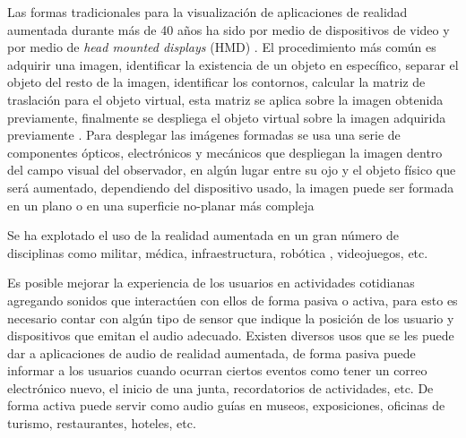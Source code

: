 \documentclass[12pt,a4paper,spanish,openany]{book}
\begin{document}
Las formas tradicionales para la visualización de aplicaciones de realidad
aumentada durante más de 40 años ha sido por medio de dispositivos de video y
por medio de \emph{head mounted displays} \cite{183317} (HMD)
\cite{Bimber:2007:MAA:1281500.1281628}. El
procedimiento más común es adquirir una imagen,
identificar la existencia de un objeto en específico, separar el objeto del
resto de la imagen, identificar los contornos, calcular la matriz de
traslación para el objeto virtual, esta matriz se aplica sobre la imagen
obtenida previamente, finalmente se despliega el objeto virtual sobre la imagen
adquirida previamente \cite{aroasf}. Para desplegar las imágenes formadas se usa
una serie de componentes ópticos, electrónicos y mecánicos que despliegan la
imagen  dentro del campo visual del observador, en algún lugar entre su ojo y
el objeto físico que será aumentado, dependiendo del dispositivo usado, la
imagen puede ser formada en un plano o en una superficie no-planar más compleja
\cite{Bimber:2007:MAA:1281500.1281628}



Se ha explotado el uso de la realidad aumentada en un gran número de
disciplinas como militar, médica\cite{mrigd},
infraestructura\cite{1527367}, robótica\cite{vhli} \cite{rmac}, videojuegos,
etc.

Es posible mejorar la experiencia de los usuarios en actividades cotidianas
agregando sonidos que interactúen con ellos de forma pasiva o activa, para esto
es necesario contar con algún tipo de sensor que indique la posición de los
usuario y dispositivos que emitan el audio adecuado. Existen diversos usos que
se les puede dar a aplicaciones de audio de realidad aumentada, de forma
pasiva puede informar a los usuarios cuando ocurran ciertos eventos como tener
un correo electrónico nuevo, el inicio de una junta, recordatorios de
actividades, etc. De forma activa puede servir como audio guías en museos,
exposiciones, oficinas de turismo, restaurantes, hoteles, etc.
\end{document}
